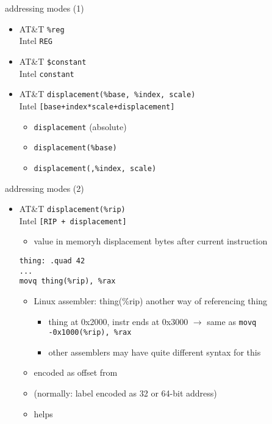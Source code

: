 
\begin{frame}[fragile,label=addressing1]{addressing modes (1)}
    \begin{itemize}
        \item {\small AT\&T} {\tt \%reg}\\ {\small Intel} {\tt REG}
        \item {\small AT\&T} {\tt \$constant} \\{\small Intel} {\tt constant}
        \item {\small AT\&T} {\tt displacement(\%base, \%index, scale)} \\
        {\small Intel} {\tt [base+index*scale+displacement]}
            \begin{itemize}
            \item {\tt displacement} (absolute)
            \item {\tt displacement(\%base)}
            \item {\tt displacement(,\%index, scale)}
            \end{itemize}
    \end{itemize}
\end{frame}

\begin{frame}[fragile,label=addressing2]{addressing modes (2)}
    \begin{itemize}
        \item {\small AT\&T} {\tt displacement(\%rip)} \\
              {\small Intel} {\tt [RIP + displacement]}
            \begin{itemize}
            \item value in memoryh displacement bytes after current instruction
            \end{itemize}

\begin{lstlisting}
thing: .quad 42
...
movq thing(%rip), %rax
\end{lstlisting}
        \begin{itemize}
        \item Linux assembler: thing(\%rip) another way of referencing thing
            \begin{itemize}
            \item thing at 0x2000, instr ends at 0x3000 $\rightarrow$ same as \texttt{movq -0x1000(\%rip), \%rax}
            \item other assemblers may have quite different syntax for this
            \end{itemize}
        \item encoded as offset from 
        \item (normally: label encoded as 32 or 64-bit address)
        \item helps 
        \end{itemize}
    \end{itemize}
\end{frame}

